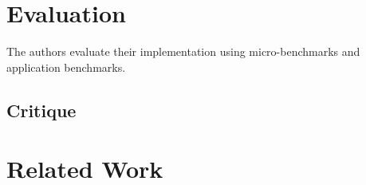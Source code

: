 \documentclass[10pt,twocolumn,letter]{article}
\begin{document}
\section{Evaluation}\label{eval}

The authors evaluate their implementation using micro-benchmarks and application benchmarks.

\subsection{Critique}\label{eval:crit}


\section{Related Work}\label{rel}
\end{document}
